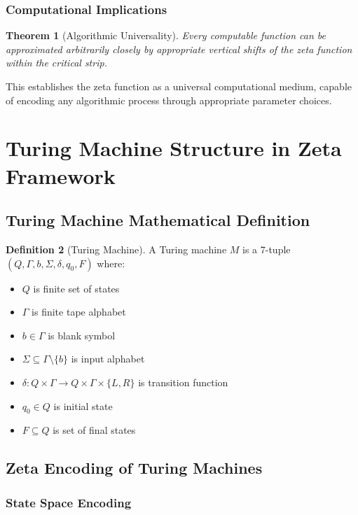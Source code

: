 \documentclass[12pt]{article}
\theoremstyle{plain}
\newtheorem{theorem}{Theorem}[section]
\theoremstyle{definition}
\newtheorem{definition}[theorem]{Definition}
\begin{document}
\subsubsection{Computational Implications}

\begin{theorem}[Algorithmic Universality]
Every computable function can be approximated arbitrarily closely by appropriate vertical shifts of the zeta function within the critical strip.
\end{theorem}

This establishes the zeta function as a universal computational medium, capable of encoding any algorithmic process through appropriate parameter choices.

\section{Turing Machine Structure in Zeta Framework}

\subsection{Turing Machine Mathematical Definition}

\begin{definition}[Turing Machine]
A Turing machine $M$ is a 7-tuple $(Q, \Gamma, b, \Sigma, \delta, q_0, F)$ where:
\begin{itemize}
\item $Q$ is finite set of states
\item $\Gamma$ is finite tape alphabet
\item $b \in \Gamma$ is blank symbol
\item $\Sigma \subseteq \Gamma \setminus \{b\}$ is input alphabet
\item $\delta: Q \times \Gamma \to Q \times \Gamma \times \{L,R\}$ is transition function
\item $q_0 \in Q$ is initial state
\item $F \subseteq Q$ is set of final states
\end{itemize}
\end{definition}

\subsection{Zeta Encoding of Turing Machines}

\subsubsection{State Space Encoding}
\end{document}
